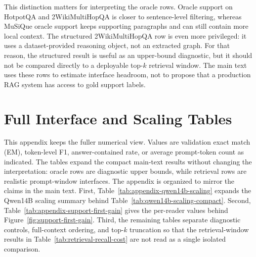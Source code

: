 \documentclass[a4paper,fleqn]{cas-sc}
\begin{document}
This distinction matters for interpreting the oracle rows. Oracle support on
HotpotQA and 2WikiMultiHopQA is closer to sentence-level filtering, whereas
MuSiQue oracle support keeps supporting paragraphs and can still contain more
local context. The structured 2WikiMultiHopQA row is even more privileged: it
uses a dataset-provided reasoning object, not an extracted graph. For that
reason, the structured result is useful as an upper-bound diagnostic, but it
should not be compared directly to a deployable top-$k$ retrieval window. The
main text uses these rows to estimate interface headroom, not to propose that a
production RAG system has access to gold support labels.

\section{Full Interface and Scaling Tables}
\label{app:full-interface-results}

This appendix keeps the fuller numerical view. Values are validation exact
match (EM), token-level F1, answer-contained rate, or average prompt-token
count as indicated.
The tables expand the compact main-text results without changing the
interpretation: oracle rows are diagnostic upper bounds, while retrieval rows
are realistic prompt-window interfaces.
The appendix is organized to mirror the claims in the main text. First,
Table~\ref{tab:appendix-qwen14b-scaling} expands the Qwen14B scaling summary
behind Table~\ref{tab:qwen14b-scaling-compact}. Second,
Table~\ref{tab:appendix-support-first-gain} gives the per-reader values behind
Figure~\ref{fig:support-first-gain}. Third, the remaining tables separate
diagnostic controls, full-context ordering, and top-$k$ truncation so that the
retrieval-window results in Table~\ref{tab:retrieval-recall-cost} are not read
as a single isolated comparison.
\end{document}
